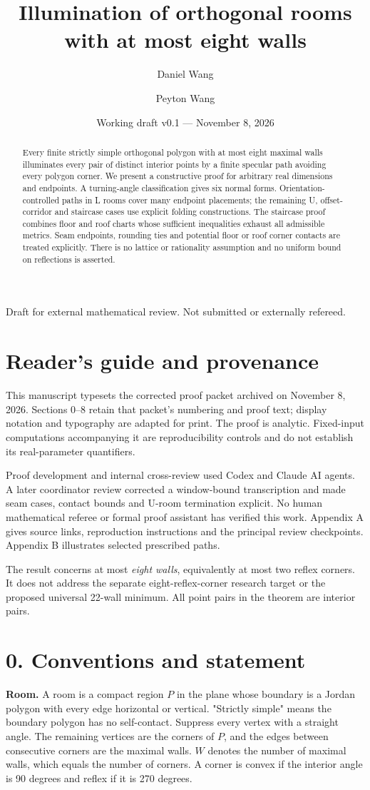 \documentclass[11pt]{article}
\title{Illumination of orthogonal rooms\\with at most eight walls}
\author{Daniel Wang \and Peyton Wang}
\date{Working draft v0.1 --- November 8, 2026}
\begin{document}
\maketitle
\begin{abstract}
Every finite strictly simple orthogonal polygon with at most eight maximal walls illuminates every pair of distinct interior points by a finite specular path avoiding every polygon corner. We present a constructive proof for arbitrary real dimensions and endpoints. A turning-angle classification gives six normal forms. Orientation-controlled paths in L rooms cover many endpoint placements; the remaining U, offset-corridor and staircase cases use explicit folding constructions. The staircase proof combines floor and roof charts whose sufficient inequalities exhaust all admissible metrics. Seam endpoints, rounding ties and potential floor or roof corner contacts are treated explicitly. There is no lattice or rationality assumption and no uniform bound on reflections is asserted.
\end{abstract}
\begin{center}\small Draft for external mathematical review. Not submitted or externally refereed.\end{center}
\section*{Reader's guide and provenance}
This manuscript typesets the corrected proof packet archived on November 8, 2026. Sections 0--8 retain that packet's numbering and proof text; display notation and typography are adapted for print. The proof is analytic. Fixed-input computations accompanying it are reproducibility controls and do not establish its real-parameter quantifiers.

Proof development and internal cross-review used Codex and Claude AI agents. A later coordinator review corrected a window-bound transcription and made seam cases, contact bounds and U-room termination explicit. No human mathematical referee or formal proof assistant has verified this work. Appendix A gives source links, reproduction instructions and the principal review checkpoints. Appendix B illustrates selected prescribed paths.

The result concerns at most \emph{eight walls}, equivalently at most two reflex corners. It does not address the separate eight-reflex-corner research target or the proposed universal 22-wall minimum. All point pairs in the theorem are interior pairs.
\section*{0. Conventions and statement}
\textbf{Room.} A room is a compact region \(P\) in the plane whose boundary is a Jordan polygon with every edge horizontal or vertical. "Strictly simple" means the boundary polygon has no self-contact. Suppress every vertex with a straight angle. The remaining vertices are the corners of \(P\), and the edges between consecutive corners are the maximal walls. \(W\) denotes the number of maximal walls, which equals the number of corners. A corner is convex if the interior angle is 90 degrees and reflex if it is 270 degrees.
\end{document}
